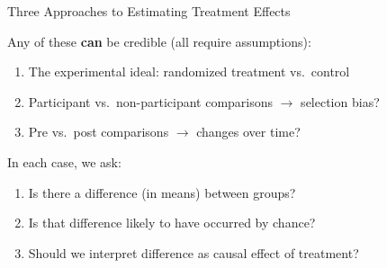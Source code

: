 \documentclass[10pt,xcolor=table,ignorenonframetext,handout,aspectratio=169]{beamer}
\newlength{\wideitemsep}
\let\olditem\item
\renewcommand{\item}{\setlength{\itemsep}{\wideitemsep}\olditem}
\begin{document}
\begin{frame}{Three Approaches to Estimating Treatment Effects}

\medskip
Any of these \textbf{can} be credible (all require assumptions):

\medskip
\begin{enumerate}
	
	\item
	The experimental ideal:  randomized treatment vs.~control
	
	\item
	Participant vs.~non-participant comparisons $\rightarrow$ selection bias?
	
	\item 
	Pre vs.~post comparisons $\rightarrow$ changes over time?
	
\end{enumerate}

\medskip
\medskip
In each case, we ask:

\medskip
\begin{enumerate}
	
	\item
	Is there a difference (in means) between groups?
	
	\item
	Is that difference likely to have occurred by chance?
	
	\item 
	Should we interpret difference as causal effect of treatment?
	
\end{enumerate}

\end{frame}



\end{document}
